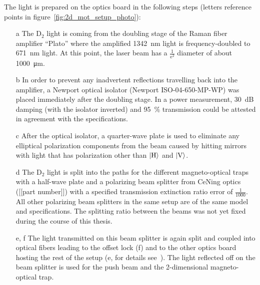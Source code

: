 The light is prepared on the optics board in the following steps (letters reference points in figure~\ref{fig:2d_mot_setup_photo}):
\begin{itemize}
    \item[a] The D$_2$ light is coming from the doubling stage of the Raman fiber amplifier ``Plato'' where the amplified \SI{1342}{\nano\meter} light is frequency-doubled to \SI{671}{\nano\meter} light. At this point, the laser beam has a $\frac{1}{\text{e}^2}$ diameter of about \SI{1000}{\micro\meter}.

    \item[b] In order to prevent any inadvertent reflections travelling back into the amplifier, a Newport optical isolator (Newport ISO-04-650-MP-WP) was placed immediately after the doubling stage. In a power measurement, \SI{30}{\deci\bel} damping (with the isolator inverted) and \SI{95}{\percent} transmission could be attested in agreement with the specifications.

    \item[c] After the optical isolator, a quarter-wave plate is used to eliminate any elliptical polarization components from the beam caused by hitting mirrors with light that has polarization other than $\Ket{\text{H}}$ and $\Ket{\text{V}}$.

    \item[d] The D$_2$ light is split into the paths for the different magneto-optical traps with a half-wave plate and a polarizing beam splitter from CeNing optics ([[part number]]) with a specified transmission extinction ratio error of $\frac{1}{1000}$. All other polarizing beam splitters in the same setup are of the same model and specifications. The splitting ratio between the beams was not yet fixed during the course of this thesis.

    \item[e, f] The light transmitted on this beam splitter is again split and coupled into optical fibers leading to the offset lock (f) and to the other optics board hosting the rest of the setup (e, for details see~\cite{qesja_design_2022}). The light reflected off on the beam splitter is used for the push beam and the 2-dimensional magneto-optical trap.


\end{itemize}
